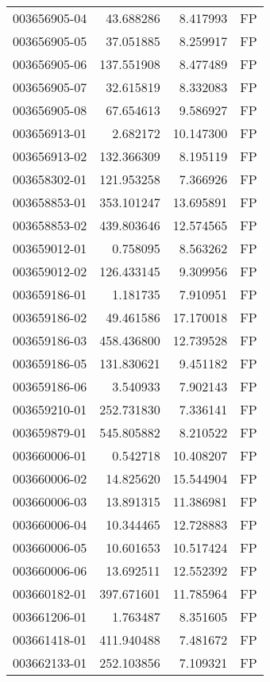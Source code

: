 \begin{tabular}{lrrl}
003656905-04 &   43.688286 &     8.417993 &   FP \\
003656905-05 &   37.051885 &     8.259917 &   FP \\
003656905-06 &  137.551908 &     8.477489 &   FP \\
003656905-07 &   32.615819 &     8.332083 &   FP \\
003656905-08 &   67.654613 &     9.586927 &   FP \\
003656913-01 &    2.682172 &    10.147300 &   FP \\
003656913-02 &  132.366309 &     8.195119 &   FP \\
003658302-01 &  121.953258 &     7.366926 &   FP \\
003658853-01 &  353.101247 &    13.695891 &   FP \\
003658853-02 &  439.803646 &    12.574565 &   FP \\
003659012-01 &    0.758095 &     8.563262 &   FP \\
003659012-02 &  126.433145 &     9.309956 &   FP \\
003659186-01 &    1.181735 &     7.910951 &   FP \\
003659186-02 &   49.461586 &    17.170018 &   FP \\
003659186-03 &  458.436800 &    12.739528 &   FP \\
003659186-05 &  131.830621 &     9.451182 &   FP \\
003659186-06 &    3.540933 &     7.902143 &   FP \\
003659210-01 &  252.731830 &     7.336141 &   FP \\
003659879-01 &  545.805882 &     8.210522 &   FP \\
003660006-01 &    0.542718 &    10.408207 &   FP \\
003660006-02 &   14.825620 &    15.544904 &   FP \\
003660006-03 &   13.891315 &    11.386981 &   FP \\
003660006-04 &   10.344465 &    12.728883 &   FP \\
003660006-05 &   10.601653 &    10.517424 &   FP \\
003660006-06 &   13.692511 &    12.552392 &   FP \\
003660182-01 &  397.671601 &    11.785964 &   FP \\
003661206-01 &    1.763487 &     8.351605 &   FP \\
003661418-01 &  411.940488 &     7.481672 &   FP \\
003662133-01 &  252.103856 &     7.109321 &   FP \\

\end{tabular}
